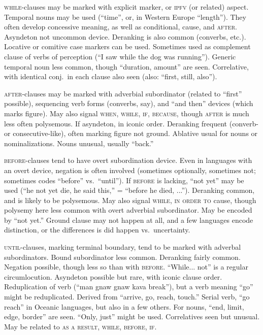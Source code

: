 \documentclass[11pt]{article}
\newcommand{\I}[1]{\textsc{#1}}   %
\begin{document}
{\I{while}-clauses may be marked with explicit marker, or \I{ipfv} (or
related) aspect.  Temporal nouns may be used (``time'', or, in Western
Europe ``length'').  They often develop concessive meaning, as well as
conditional, cause, and \I{after}.  Asyndeton not uncommon device.
Deranking is also common (converbs, etc.).  Locative or comitive case
markers can be used.  Sometimes used as complement clause of verbs of
perception (``I saw while the dog was running'').  Generic temporal
noun less common, though ``duration, amount'' are seen.  Correlative,
with identical conj.\ in each clause also seen (also: ``first, still,
also'').  

\I{after}-clauses may be marked with adverbial subordinator (related
to ``first'' possible), sequencing verb forms (converbs, say), and
``and then'' devices (which marks figure).  May also signal \I{when,
while, if, because,} though \I{after} is much less often polysemous.
If asyndeton, in iconic order.  Deranking frequent (converb- or
consecutive-like), often marking figure not ground.  Ablative usual
for nouns or nominalizations.  Nouns unusual, usually ``back.''

\I{before}-clauses tend to have overt subordination device.  Even in
languages with an overt device, negation is often involved (sometimes
optionally, sometimes not; sometimes codes ``before'' vs.\ ``until'').
If \I{before} is lacking, ``not yet'' may be used (``he not yet die,
he said this,'' = ``before he died, ...'').  Deranking common, and is
likely to be polysemous.  May also signal \I{while, in order to}
cause, though polysemy here less common with overt adverbial
subordinator.  May be encoded by ``not yet.''  Ground clause may not
happen at all, and a few languages encode distinction, or the
differences is did happen vs.\ uncertainty.

\I{until}-clauses, marking terminal boundary, tend to be marked with
adverbal subordinators.  Bound subordinator less common.  Deranking
fairly common.  Negation possible, though less so than with
\I{before}.  ``While... not'' is a regular circumlocution.  Asyndeton
possible but rare, with iconic clause order.  Reduplication of verb
(``man gnaw gnaw kava break''), but a verb meaning ``go'' might be
reduplicated.  Derived from ``arrive, go, reach, touch.''  Serial
verb, ``go reach'' in Oceanic languages, but also in a few others.
For nouns, ``end, limit, edge, border'' are seen.  ``Only, just''
might be used.  Correlatives seen but unusual.  May be related to
\I{as a result, while, before, if}.

}
\end{document}
